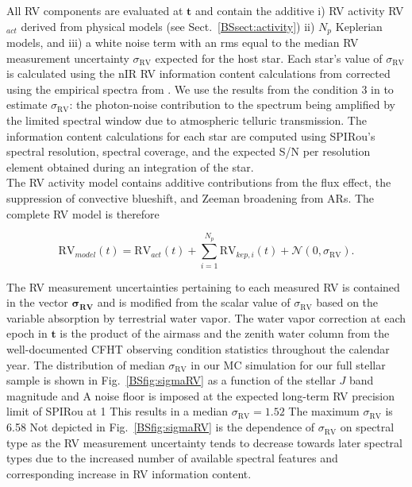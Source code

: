 All RV components are evaluated at $\mathbf{t}$ and contain the additive i) RV activity RV$_{act}$ derived from 
physical models (see Sect.~\ref{BSsect:activity}) ii) $N_p$ Keplerian models, and iii) a white noise term with an rms equal
to the median RV measurement uncertainty $\sigma_{\text{RV}}$ expected for the host star. Each star's value of
$\sigma_{\text{RV}}$ is calculated using the nIR RV
information content calculations from \cite{figueira16} corrected using the empirical spectra from \cite{artigau18}.
We use the results from the condition 3 in \cite{figueira16} to estimate $\sigma_{\text{RV}}$:
the photon-noise contribution to the spectrum
being amplified by the limited spectral window due to atmospheric telluric transmission.
The information content calculations for each star are computed using SPIRou's spectral resolution,
spectral coverage, and the expected S/N per resolution element obtained during an integration of the star. \\

The RV activity model contains additive contributions from the flux effect, the suppression of convective blueshift,
and Zeeman broadening from ARs. The complete RV model is therefore

\begin{equation}
  \text{RV}_{model}(t) = \text{RV}_{act}(t) + \sum_{i=1}^{N_p} \text{RV}_{kep,i}(t) + \mathcal{N}(0,\sigma_{\text{RV}}).
\end{equation}

\noindent The RV measurement uncertainties pertaining to each measured RV is contained in the vector
$\boldsymbol{\sigma_{\text{RV}}}$ and is modified from the scalar value of $\sigma_{\text{RV}}$
based on the variable absorption by terrestrial
water vapor. The water vapor correction at each epoch in $\mathbf{t}$ is the product of the airmass and the zenith
water column from the well-documented CFHT observing condition statistics throughout the calendar year. 
The distribution of median $\sigma_{\text{RV}}$ in our MC simulation for our full
stellar sample is shown in Fig.~\ref{BSfig:sigmaRV} as a function
of the stellar $J$ band magnitude and  A noise floor is imposed at the expected long-term RV precision limit
of SPIRou at 1  This results in a median
$\sigma_{\text{RV}}=1.52$  The maximum $\sigma_{\text{RV}}$ is 6.58  
Not depicted in Fig.~\ref{BSfig:sigmaRV} is the dependence of
$\sigma_{\text{RV}}$ on spectral type as the RV measurement uncertainty tends to decrease towards later spectral types
due to the increased number of available spectral features and corresponding increase in RV information content. \\

